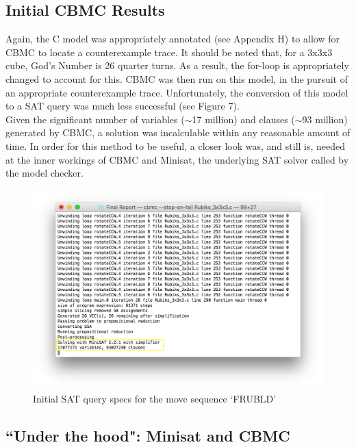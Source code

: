 \documentclass{article}
\begin{document}
\subsection {Initial CBMC Results}

Again, the C model was appropriately annotated (see Appendix H) to allow for CBMC to locate a counterexample trace. It should be noted that, for a 3x3x3 cube, God's Number is 26 quarter turns. As a result, the for-loop is appropriately changed to account for this. CBMC was then run on this model, in the pursuit of an appropriate counterexample trace. Unfortunately, the conversion of this model to a SAT query was much less successful (see Figure 7).\\

\noindent Given the significant number of variables ($\sim$17 million) and clauses ($\sim$93 million) generated by CBMC, a solution was incalculable within any reasonable amount of time. In order for this method to be useful, a closer look was, and still is, needed at the inner workings of CBMC and Minisat, the underlying SAT solver called by the model checker.\\

\begin{figure}[h]
\includegraphics[width=\textwidth]{pics/3x3x3_SAT_Query_Specs.png}
\caption{Initial SAT query specs for the move sequence `FRUBLD'}
\end{figure}

\subsection {``Under the hood": Minisat and CBMC}
\end{document}
